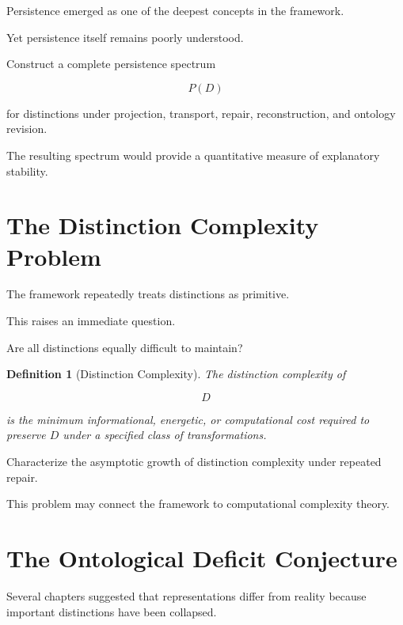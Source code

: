 \documentclass[11pt,oneside,openany]{book}
\newtheorem{definition}{Definition}[chapter] \newtheorem{theorem}{Theorem}[chapter] \newtheorem{proposition}{Proposition}[chapter] \newtheorem{lemma}{Lemma}[chapter] \newtheorem{corollary}{Corollary}[chapter] \newtheorem{remark}{Remark}[chapter]
\begin{document}
Persistence emerged as one of the deepest concepts in the framework.

Yet persistence itself remains poorly understood.

\begin{problem}

Construct a complete persistence spectrum

\[
P(D)
\]

for distinctions under projection, transport, repair, reconstruction, and ontology revision.

\end{problem}

The resulting spectrum would provide a quantitative measure of explanatory stability.

\section{The Distinction Complexity Problem}

The framework repeatedly treats distinctions as primitive.

This raises an immediate question.

Are all distinctions equally difficult to maintain?

\begin{definition}[Distinction Complexity]

The distinction complexity of

\[
D
\]

is the minimum informational, energetic, or computational cost required to preserve \(D\) under a specified class of transformations.

\end{definition}

\begin{problem}

Characterize the asymptotic growth of distinction complexity under repeated repair.

\end{problem}

This problem may connect the framework to computational complexity theory.

\section{The Ontological Deficit Conjecture}

Several chapters suggested that representations differ from reality because important distinctions have been collapsed.
\end{document}
